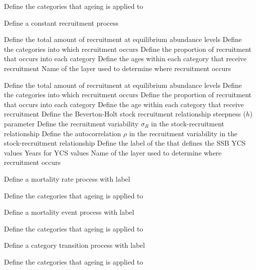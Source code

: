  {Define the categories that ageing is applied to}
\par {} {Define a constant recruitment process}\par \par
{} {Define the total amount of recruitment at equilibrium abundance levels}
 {Define the categories into which recruitment occurs}
 {Define the proportion of recruitment that occurs into each category}
 {Define the ages within each category that receive recruitment}
 {Name of the layer used to determine where recruitment occurs}
\par {}\par \par
{} {Define the total amount of recruitment at equilibrium abundance levels}
 {Define the categories into which recruitment occurs}
 {Define the proportion of recruitment that occurs into each category}
 {Define the age within each category that receive recruitment}
 {Define the Beverton-Holt stock recruitment relationship steepness ($h$) parameter}
 {Define the recruitment variability $\sigma_R$ in the stock-recruitment relationship}
 {Define the autocorrelation $\rho$ in the recruitment variability in the stock-recruitment relationship}
 {Define the label of the  that defines the SSB}
 {YCS values}
 {Years for YCS values}
 {Name of the layer used to determine where recruitment occurs}
\par {} {Define a mortality rate process with label}\par \par
{} {Define the categories that ageing is applied to}
\par {} {Define a mortality event process with label}\par \par
{} {Define the categories that ageing is applied to}
\par {} {Define a category transition process with label}\par \par
{} {Define the categories that ageing is applied to}
